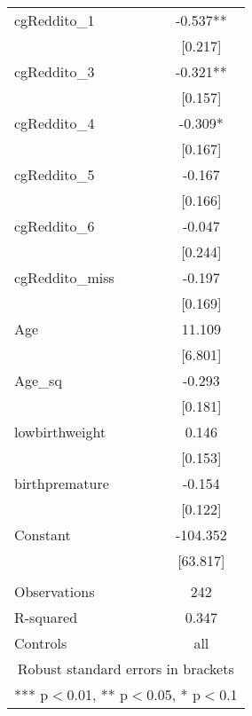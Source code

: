\documentclass[]{article}
\begin{document}
\begin{tabular}{lc}
cgReddito\_1 & -0.537** \\
 & [0.217] \\
cgReddito\_3 & -0.321** \\
 & [0.157] \\
cgReddito\_4 & -0.309* \\
 & [0.167] \\
cgReddito\_5 & -0.167 \\
 & [0.166] \\
cgReddito\_6 & -0.047 \\
 & [0.244] \\
cgReddito\_miss & -0.197 \\
 & [0.169] \\
Age & 11.109 \\
 & [6.801] \\
Age\_sq & -0.293 \\
 & [0.181] \\
lowbirthweight & 0.146 \\
 & [0.153] \\
birthpremature & -0.154 \\
 & [0.122] \\
Constant & -104.352 \\
 & [63.817] \\
 &  \\
Observations & 242 \\
R-squared & 0.347 \\
 Controls & all \\ \hline
\multicolumn{2}{c}{ Robust standard errors in brackets} \\
\multicolumn{2}{c}{ *** p$<$0.01, ** p$<$0.05, * p$<$0.1} \\
\end{tabular}
\end{document}
